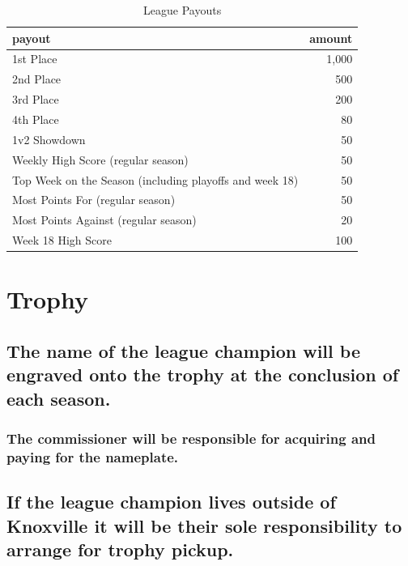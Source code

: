 \documentclass[
]{book}
\begin{document}
\begin{table}

\caption{\label{tab:unnamed-chunk-7}League Payouts}
\centering
\begin{tabular}[t]{lr}
\toprule
payout & amount\\
\midrule
1st Place & 1,000\\
2nd Place & 500\\
3rd Place & 200\\
4th Place & 80\\
1v2 Showdown & 50\\
\addlinespace
Weekly High Score (regular season) & 50\\
Top Week on the Season (including playoffs and week 18) & 50\\
Most Points For (regular season) & 50\\
Most Points Against (regular season) & 20\\
Week 18 High Score & 100\\
\bottomrule
\end{tabular}
\end{table}

\hypertarget{trophy}{%
\section{Trophy}\label{trophy}}

\hypertarget{the-name-of-the-league-champion-will-be-engraved-onto-the-trophy-at-the-conclusion-of-each-season.}{%
\subsection{The name of the league champion will be engraved onto the trophy at the conclusion of each season.}\label{the-name-of-the-league-champion-will-be-engraved-onto-the-trophy-at-the-conclusion-of-each-season.}}

\hypertarget{the-commissioner-will-be-responsible-for-acquiring-and-paying-for-the-nameplate.}{%
\subsubsection{The commissioner will be responsible for acquiring and paying for the nameplate.}\label{the-commissioner-will-be-responsible-for-acquiring-and-paying-for-the-nameplate.}}

\hypertarget{if-the-league-champion-lives-outside-of-knoxville-it-will-be-their-sole-responsibility-to-arrange-for-trophy-pickup.}{%
\subsection{If the league champion lives outside of Knoxville it will be their sole responsibility to arrange for trophy pickup.}\label{if-the-league-champion-lives-outside-of-knoxville-it-will-be-their-sole-responsibility-to-arrange-for-trophy-pickup.}}
\end{document}

